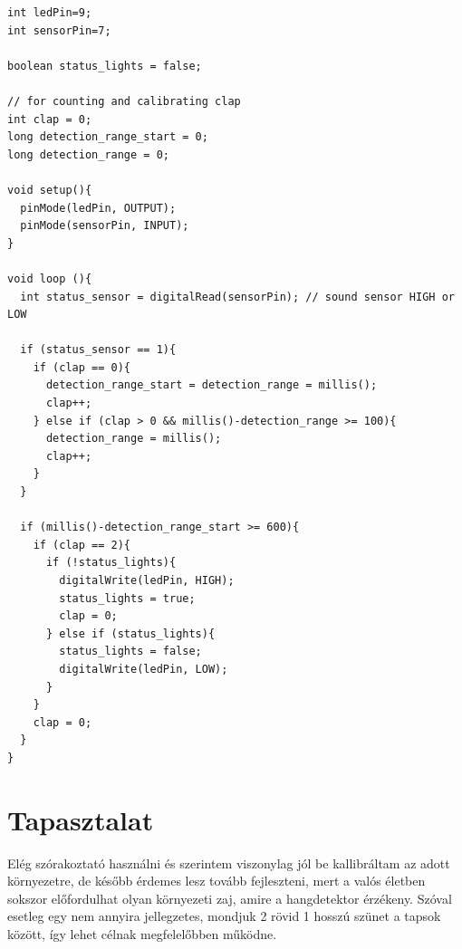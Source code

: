\documentclass[a4paper,11pt]{article}
\begin{document}
\begin{lstlisting}[basicstyle=\small]
int ledPin=9;
int sensorPin=7;

boolean status_lights = false;

// for counting and calibrating clap
int clap = 0;
long detection_range_start = 0;
long detection_range = 0;

void setup(){
  pinMode(ledPin, OUTPUT);
  pinMode(sensorPin, INPUT);
}
  
void loop (){
  int status_sensor = digitalRead(sensorPin); // sound sensor HIGH or LOW
  
  if (status_sensor == 1){
    if (clap == 0){
      detection_range_start = detection_range = millis();
      clap++; 
    } else if (clap > 0 && millis()-detection_range >= 100){
      detection_range = millis();
      clap++;
    }
  }
  
  if (millis()-detection_range_start >= 600){
    if (clap == 2){ 
      if (!status_lights){
        digitalWrite(ledPin, HIGH);
        status_lights = true;
        clap = 0;
      } else if (status_lights){
        status_lights = false;
        digitalWrite(ledPin, LOW);
      }
    }
    clap = 0;
  }
}
\end{lstlisting} 

\section{Tapasztalat}

Elég szórakoztató használni és szerintem viszonylag jól be kallibráltam az adott környezetre, de később érdemes lesz tovább fejleszteni, mert a valós életben sokszor előfordulhat olyan környezeti zaj, amire a hangdetektor érzékeny. Szóval esetleg egy nem annyira jellegzetes, mondjuk 2 rövid 1 hosszú szünet a tapsok között, így lehet célnak megfelelőbben működne.

\vspace{0.5cm}
	
\end{document}
